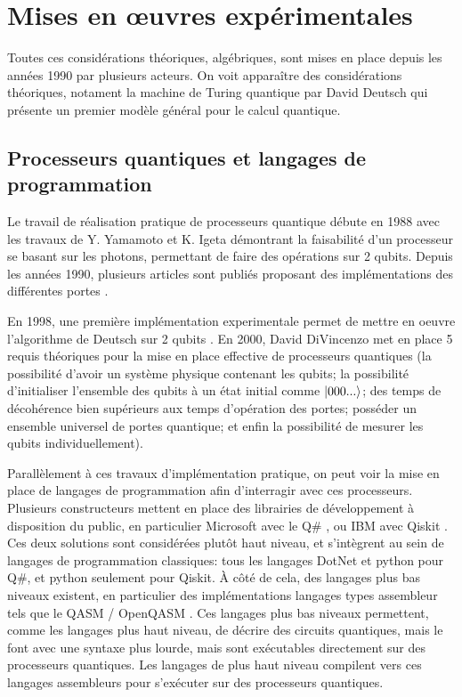 \chapter{Mises en \oe{}uvres expérimentales}

Toutes ces considérations théoriques, algébriques, sont mises en place depuis les années 1990 par plusieurs acteurs. On voit apparaître des considérations théoriques, notament la machine de Turing quantique par David Deutsch \cite{Deutsch85} qui présente un premier modèle général pour le calcul quantique. 

\section{Processeurs quantiques et langages de programmation}
Le travail de réalisation pratique de processeurs quantique débute en 1988 avec les travaux de Y. Yamamoto et K. Igeta \cite{Igeta:88} démontrant la faisabilité d'un processeur se basant sur les photons, permettant de faire des opérations sur 2 qubits. Depuis les années 1990, plusieurs articles sont publiés proposant des implémentations des différentes portes \cite{Zhu_2002, Zhu_13, 1314241}.

En 1998, une première implémentation experimentale permet de mettre en oeuvre l'algorithme de Deutsch sur 2 qubits \cite{Chuang1998ExperimentalIO}. En 2000, David DiVincenzo met en place 5 requis théoriques pour la mise en place effective de processeurs quantiques \cite{DiVincenzo_2000} (la possibilité d'avoir un système physique contenant les qubits; la possibilité d'initialiser l'ensemble des qubits à un état initial comme $\ket{000...}$; des temps de décohérence bien supérieurs aux temps d'opération des portes; posséder un ensemble universel de portes quantique; et enfin la possibilité de mesurer les qubits individuellement).

Parallèlement à ces travaux d'implémentation pratique, on peut voir la mise en place de langages de programmation afin d'interragir avec ces processeurs. Plusieurs constructeurs mettent en place des librairies de développement à disposition du public, en particulier Microsoft avec le Q\# \cite{MicrosoftQuantumDoc}, ou IBM avec Qiskit \cite{Qiskit}. Ces deux solutions sont considérées plutôt haut niveau, et s'intègrent au sein de langages de programmation classiques: tous les langages DotNet et python pour Q\#, et python seulement pour Qiskit. \`A côté de cela, des langages plus bas niveaux existent, en particulier des implémentations langages types assembleur tels que le QASM / OpenQASM \cite{cross2017open}. Ces langages plus bas niveaux permettent, comme les langages plus haut niveau, de décrire des circuits quantiques, mais le font avec une syntaxe plus lourde, mais sont exécutables directement sur des processeurs quantiques. Les langages de plus haut niveau compilent vers ces langages assembleurs pour s'exécuter sur des processeurs quantiques.

